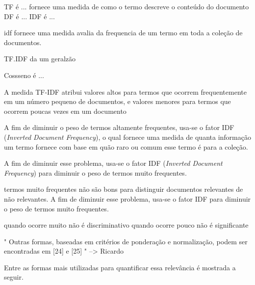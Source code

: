 
TF é ... fornece uma medida de como o termo descreve o conteúdo do documento
DF é ... 
IDF é ... 

idf fornece uma medida avalia da frequencia de um termo em toda a coleção de documentos.

TF.IDF da um geralzão



Cossseno é ... 


A medida TF-IDF atribui valores altos para termos que ocorrem frequentemente em um número pequeno de documentos, e valores menores para termos que ocorrem poucas vezes em um documento

A fim de diminuir o peso de termos altamente frequentes, usa-se o fator IDF (\textit{Inverted Document Frequency}), o qual fornece uma medida de quanta informação um termo fornece com base em quão raro ou comum esse termo é para a coleção.

A fim de diminuir esse problema, usa-se o fator IDF (\textit{Inverted Document Frequency}) para diminuir o peso de termos muito frequentes. 

termos muito frequentes não são bons para distinguir documentos relevantes de não relevantes. A fim de diminuir esse problema, usa-se o fator IDF para diminuir o peso de termos muito frequentes.




quando ocorre muito não é discriminativo
quando ocorre pouco não é significante




" Outras formas, baseadas em critérios de
ponderação e normalização, podem ser encontradas em
[24] e [25] " --> Ricardo







Entre as formas mais utilizadas para quantificar essa relevância é mostrada a seguir. 

